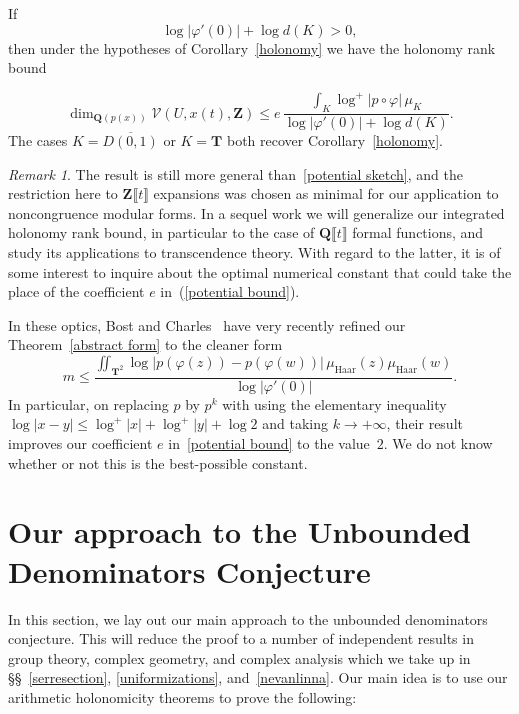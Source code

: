\documentclass[10pt]{amsart}
\def\SSSSs{\S\S}
\def\T{\mathbf{T}}
\def\Z{\mathbf{Z}}
\def\Q{\mathbf{Q}}
\theoremstyle{remark}
\newtheorem{remark}[subsubsection]{Remark}
\numberwithin{equation}{subsection}
\def\numequation{\addtocounter{subsubsection}{1}\begin{equation}}
\begin{document}
If 
$$
\log{|\varphi'(0)|} + \log{d(K)} > 0,
$$
then under the hypotheses of Corollary~\ref{holonomy} we have the holonomy rank bound 
  \numequation  \label{potential bound}
\dim_{\Q(p(x))} \mathcal{V}(U,x(t),\Z)  \leq e  \, \frac{  \int_{K} \log^+{|p \circ \varphi|} \, \mu_{K}}{\log{|\varphi'(0)|} + \log{d(K)}}.
  \end{equation}
The cases $K  = \overline{D(0,1)}$ or $K = \T$ both recover Corollary~\ref{holonomy}.  


\begin{remark}
The result is still more general than~\ref{potential sketch}, and the restriction here to $\Z\llbracket t \rrbracket$ expansions was chosen as minimal for our application to noncongruence modular forms. 
In a sequel work we will generalize our integrated holonomy rank bound, in particular to the case of $\Q\llbracket t \rrbracket$ formal functions, and study its applications to transcendence theory. 
With regard to the latter, it is of some interest to inquire about the optimal numerical constant that could take the place of the coefficient $e$ in~(\ref{potential bound}).

In these optics,  Bost and Charles~\cite[Corollary~8.3.5]{BostCharles} have very recently refined our Theorem~\ref{abstract form} 
to the cleaner form
$$
m  \leq \frac{\iint_{\T^2} \log{ |p(\varphi(z)) - p(\varphi(w))| }  \, \mu_{\mathrm{Haar}}(z) \mu_{\mathrm{Haar}}(w) }{\log{|\varphi'(0)|}}. 
$$
In particular, on replacing $p$ by $p^k$ with using the elementary inequality $\log{|x-y|} \leq \log^+{|x|} + \log^+{|y|} + \log{2}$ and
taking $k \to +\infty$, their result improves our coefficient $e$ in~\eqref{potential bound} to the value~$2$.   We do not know whether or not this is the best-possible constant. 
\end{remark}

\section{Our approach to the Unbounded Denominators Conjecture}   \label{main plan}

In this section, we lay out our main approach to the  unbounded
denominators conjecture.
This will reduce the proof to a number of independent results
in group theory, complex geometry, and complex analysis which we
take up in \SSSSs~\ref{serresection}, \ref{uniformizations}, and~\ref{nevanlinna}.
Our main idea is to use 
our arithmetic holonomicity theorems to prove the following:
\end{document}
